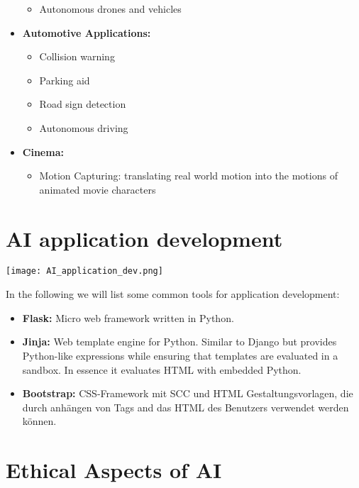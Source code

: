 \begin{itemize}
\begin{itemize}
              \item Autonomous drones and vehicles
          \end{itemize}
    \item \textbf{Automotive Applications:}
          \begin{itemize}
              \item Collision warning
              \item Parking aid
              \item Road sign detection
              \item Autonomous driving
          \end{itemize}
    \item \textbf{Cinema:}
          \begin{itemize}
              \item Motion Capturing: translating real world motion into the motions of animated movie characters
          \end{itemize}
\end{itemize}

\section{AI application development}

\texttt{[image: AI\_application\_dev.png]}

In the following we will list some common tools for application development:

\begin{itemize}
    \item \textbf{Flask:} Micro web framework written in Python.
    \item \textbf{Jinja:} Web template engine for Python. Similar to Django but provides Python-like expressions while ensuring that templates are evaluated in a sandbox. In essence it evaluates HTML with embedded Python.
    \item \textbf{Bootstrap:} CSS-Framework mit SCC und HTML Gestaltungsvorlagen, die durch anhängen von Tags and das HTML des Benutzers verwendet werden können.
\end{itemize}

\section{Ethical Aspects of AI}


